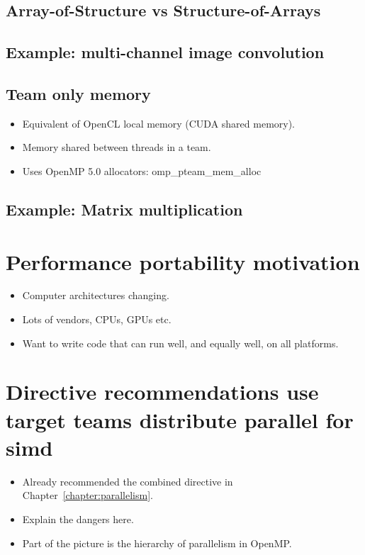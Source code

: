 \subsection{Array-of-Structure vs Structure-of-Arrays}
\subsection{Example: multi-channel image convolution}

\subsection{Team only memory}
\label{sec:team_only_memory}
\begin{itemize}
  \item Equivalent of OpenCL local memory (CUDA shared memory).
  \item Memory shared between threads in a team.
  \item Uses OpenMP 5.0 allocators: omp\_pteam\_mem\_alloc
\end{itemize}
\subsection{Example: Matrix multiplication}

\section{Performance portability motivation}
\begin{itemize}
  \item Computer architectures changing.
  \item Lots of vendors, CPUs, GPUs etc.
  \item Want to write code that can run well, and equally well, on all platforms.
\end{itemize}


\section{Directive recommendations use target teams distribute parallel for simd}
\begin{itemize}
  \item Already recommended the combined directive in Chapter~\ref{chapter:parallelism}.
  \item Explain the dangers here.
  \item Part of the picture is the hierarchy of parallelism in OpenMP.
\end{itemize}

